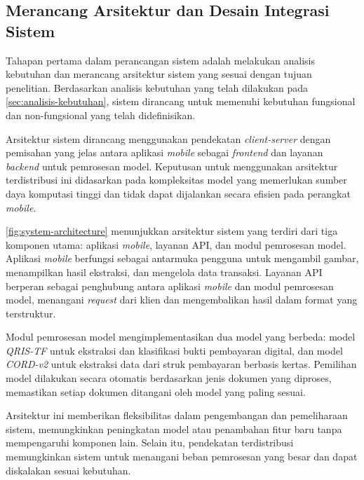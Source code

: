 \subsection{Merancang Arsitektur dan Desain Integrasi Sistem}
\label{subsec:analisis-kebutuhan-arsitektur}

Tahapan pertama dalam perancangan sistem adalah melakukan analisis kebutuhan dan merancang arsitektur sistem yang sesuai dengan tujuan penelitian. Berdasarkan analisis kebutuhan yang telah dilakukan pada \autoref{sec:analisis-kebutuhan}, sistem dirancang untuk memenuhi kebutuhan fungsional dan non-fungsional yang telah didefinisikan.

Arsitektur sistem dirancang menggunakan pendekatan \textit{client-server} dengan pemisahan yang jelas antara aplikasi \textit{mobile} sebagai \textit{frontend} dan layanan \textit{backend} untuk pemrosesan model. Keputusan untuk menggunakan arsitektur terdistribusi ini didasarkan pada kompleksitas model \donut{} yang memerlukan sumber daya komputasi tinggi dan tidak dapat dijalankan secara efisien pada perangkat \textit{mobile}.


\autoref{fig:system-architecture} menunjukkan arsitektur sistem yang terdiri dari tiga komponen utama: aplikasi \textit{mobile}, layanan API, dan modul pemrosesan model. Aplikasi \textit{mobile} berfungsi sebagai antarmuka pengguna untuk mengambil gambar, menampilkan hasil ekstraksi, dan mengelola data transaksi. Layanan API berperan sebagai penghubung antara aplikasi \textit{mobile} dan modul pemrosesan model, menangani \textit{request} dari klien dan mengembalikan hasil dalam format yang terstruktur.

Modul pemrosesan model mengimplementasikan dua model \donut{} yang berbeda: model \textit{QRIS-TF} untuk ekstraksi dan klasifikasi bukti pembayaran digital, dan model \textit{CORD-v2} untuk ekstraksi data dari struk pembayaran berbasis kertas. Pemilihan model dilakukan secara otomatis berdasarkan jenis dokumen yang diproses, memastikan setiap dokumen ditangani oleh model yang paling sesuai.

Arsitektur ini memberikan fleksibilitas dalam pengembangan dan pemeliharaan sistem, memungkinkan peningkatan model atau penambahan fitur baru tanpa mempengaruhi komponen lain. Selain itu, pendekatan terdistribusi memungkinkan sistem untuk menangani beban pemrosesan yang besar dan dapat diskalakan sesuai kebutuhan.
